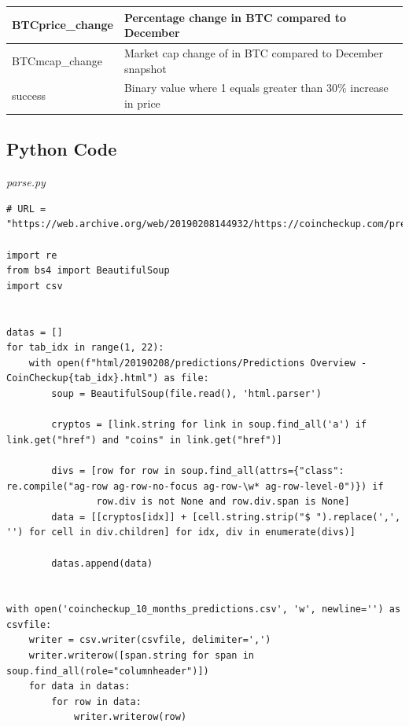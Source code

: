 \documentclass[11pt, english, letterpaper]{article}
\begin{document}
\begin{longtable}{|p{5cm}|p{10cm}|}
BTCprice\_change       & Percentage change in BTC compared to December                                                                                                   \\ \hline
BTCmcap\_change        & Market cap change of in BTC compared to December snapshot                                                                                       \\ \hline
success                & Binary value where 1 equals greater than 30\% increase in price                                                                                 \\ \hline
\end{longtable}

\newpage

\subsection{Python Code}

\hfill\break

\emph{parse.py}

\begin{lstlisting}
# URL = "https://web.archive.org/web/20190208144932/https://coincheckup.com/predictions"

import re
from bs4 import BeautifulSoup
import csv


datas = []
for tab_idx in range(1, 22):
    with open(f"html/20190208/predictions/Predictions Overview - CoinCheckup{tab_idx}.html") as file:
        soup = BeautifulSoup(file.read(), 'html.parser')

        cryptos = [link.string for link in soup.find_all('a') if link.get("href") and "coins" in link.get("href")]

        divs = [row for row in soup.find_all(attrs={"class": re.compile("ag-row ag-row-no-focus ag-row-\w* ag-row-level-0")}) if
                row.div is not None and row.div.span is None]
        data = [[cryptos[idx]] + [cell.string.strip("$ ").replace(',', '') for cell in div.children] for idx, div in enumerate(divs)]

        datas.append(data)


with open('coincheckup_10_months_predictions.csv', 'w', newline='') as csvfile:
    writer = csv.writer(csvfile, delimiter=',')
    writer.writerow([span.string for span in soup.find_all(role="columnheader")])
    for data in datas:
        for row in data:
            writer.writerow(row)

\end{lstlisting}
\end{document}
